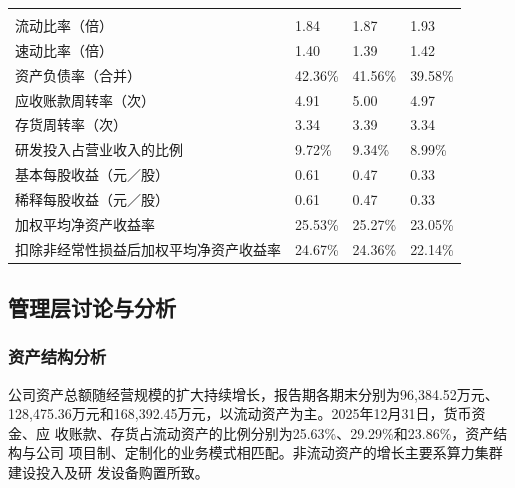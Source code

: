 \begin{gstab}
\begin{longtable}{|L{49mm}|R{29mm}|R{29mm}|R{29mm}|}
\hline
{} &  &  &  \\ \hline
\endfirsthead
\hline
{} &  &  &  \\ \hline
\endhead
流动比率（倍） & 1.84 & 1.87 & 1.93 \\ \hline
速动比率（倍） & 1.40 & 1.39 & 1.42 \\ \hline
资产负债率（合并） & 42.36\% & 41.56\% & 39.58\% \\ \hline
应收账款周转率（次） & 4.91 & 5.00 & 4.97 \\ \hline
存货周转率（次） & 3.34 & 3.39 & 3.34 \\ \hline
研发投入占营业收入的比例 & 9.72\% & 9.34\% & 8.99\% \\ \hline
基本每股收益（元／股） & 0.61 & 0.47 & 0.33 \\ \hline
稀释每股收益（元／股） & 0.61 & 0.47 & 0.33 \\ \hline
加权平均净资产收益率 & 25.53\% & 25.27\% & 23.05\% \\ \hline
扣除非经常性损益后加权平均净资产收益率 & 24.67\% & 24.36\% & 22.14\% \\ \hline
\end{longtable}
\end{gstab}

\subsection{管理层讨论与分析}

\subsubsection{资产结构分析}

公司资产总额随经营规模的扩大持续增长，报告期各期末分别为96,384.52万元、
128,475.36万元和168,392.45万元，以流动资产为主。2025年12月31日，货币资金、应
收账款、存货占流动资产的比例分别为25.63\%、29.29\%和23.86\%，资产结构与公司
项目制、定制化的业务模式相匹配。非流动资产的增长主要系算力集群建设投入及研
发设备购置所致。

